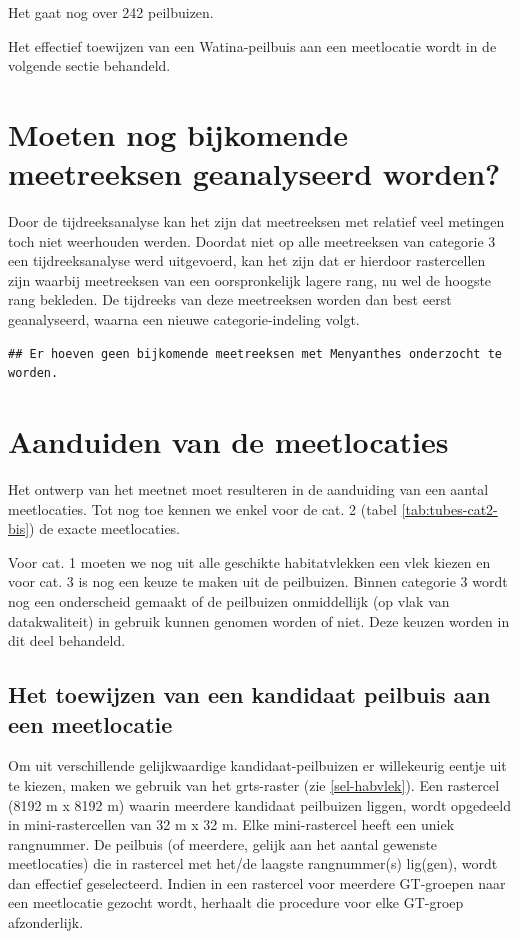 \documentclass[11pt,]{book}
\begin{document}
Het gaat nog over 242 peilbuizen.

Het effectief toewijzen van een Watina-peilbuis aan een meetlocatie
wordt in de volgende sectie behandeld.

\section{Moeten nog bijkomende meetreeksen geanalyseerd
worden?}\label{moeten-nog-bijkomende-meetreeksen-geanalyseerd-worden}

Door de tijdreeksanalyse kan het zijn dat meetreeksen met relatief veel
metingen toch niet weerhouden werden. Doordat niet op alle meetreeksen
van categorie 3 een tijdreeksanalyse werd uitgevoerd, kan het zijn dat
er hierdoor rastercellen zijn waarbij meetreeksen van een oorspronkelijk
lagere rang, nu wel de hoogste rang bekleden. De tijdreeks van deze
meetreeksen worden dan best eerst geanalyseerd, waarna een nieuwe
categorie-indeling volgt.

\begin{verbatim}
## Er hoeven geen bijkomende meetreeksen met Menyanthes onderzocht te worden.
\end{verbatim}

\section{Aanduiden van de
meetlocaties}\label{aanduiden-van-de-meetlocaties}

Het ontwerp van het meetnet moet resulteren in de aanduiding van een
aantal meetlocaties. Tot nog toe kennen we enkel voor de cat. 2 (tabel
\ref{tab:tubes-cat2-bis}) de exacte meetlocaties.

Voor cat. 1 moeten we nog uit alle geschikte habitatvlekken een vlek
kiezen en voor cat. 3 is nog een keuze te maken uit de peilbuizen.
Binnen categorie 3 wordt nog een onderscheid gemaakt of de peilbuizen
onmiddellijk (op vlak van datakwaliteit) in gebruik kunnen genomen
worden of niet. Deze keuzen worden in dit deel behandeld.

\subsection{Het toewijzen van een kandidaat peilbuis aan een
meetlocatie}\label{het-toewijzen-van-een-kandidaat-peilbuis-aan-een-meetlocatie}

Om uit verschillende gelijkwaardige kandidaat-peilbuizen er willekeurig
eentje uit te kiezen, maken we gebruik van het grts-raster (zie
\ref{sel-habvlek}). Een rastercel (8192 m x 8192 m) waarin meerdere
kandidaat peilbuizen liggen, wordt opgedeeld in mini-rastercellen van 32
m x 32 m. Elke mini-rastercel heeft een uniek rangnummer. De peilbuis
(of meerdere, gelijk aan het aantal gewenste meetlocaties) die in
rastercel met het/de laagste rangnummer(s) lig(gen), wordt dan effectief
geselecteerd. Indien in een rastercel voor meerdere GT-groepen naar een
meetlocatie gezocht wordt, herhaalt die procedure voor elke GT-groep
afzonderlijk.
\end{document}
